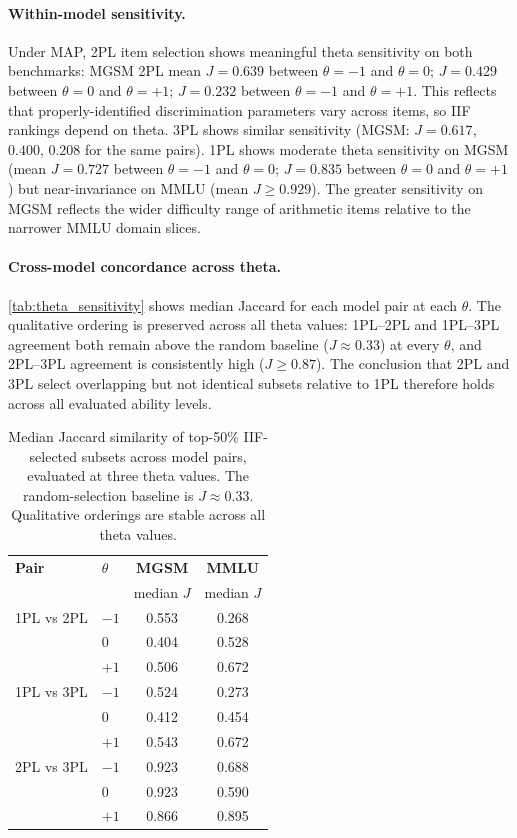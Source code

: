 \documentclass[11pt]{article}
\begin{document}
\paragraph{Within-model sensitivity.}
Under MAP, 2PL item selection shows meaningful theta sensitivity on both benchmarks:
MGSM 2PL mean $J = 0.639$ between $\theta=-1$ and $\theta=0$; $J = 0.429$ between
$\theta=0$ and $\theta=+1$; $J = 0.232$ between $\theta=-1$ and $\theta=+1$.
This reflects that properly-identified discrimination parameters vary across items,
so IIF rankings depend on theta. 3PL shows similar sensitivity (MGSM: $J = 0.617$,
$0.400$, $0.208$ for the same pairs).
1PL shows moderate theta sensitivity on MGSM (mean $J = 0.727$ between
$\theta=-1$ and $\theta=0$; $J = 0.835$ between $\theta=0$ and $\theta=+1$)
but near-invariance on MMLU (mean $J \geq 0.929$). The greater sensitivity on
MGSM reflects the wider difficulty range of arithmetic items relative to the
narrower MMLU domain slices.

\paragraph{Cross-model concordance across theta.}
\autoref{tab:theta_sensitivity} shows median Jaccard for each model pair at
each $\theta$. The qualitative ordering is preserved across all theta values:
1PL--2PL and 1PL--3PL agreement both remain above the random baseline ($J \approx 0.33$)
at every $\theta$, and 2PL--3PL agreement is consistently high ($J \geq 0.87$).
The conclusion that 2PL and 3PL select overlapping but not identical subsets
relative to 1PL therefore holds across all evaluated ability levels.

\begin{table}[h]
  \centering
  \small
  \begin{tabular}{llcc}
    \toprule
    \textbf{Pair} & $\theta$ & \textbf{MGSM} & \textbf{MMLU} \\
                  &          & median $J$    & median $J$ \\
    \midrule
    1PL vs 2PL & $-1$ & 0.553 & 0.268 \\
               &  $0$ & 0.404 & 0.528 \\
               & $+1$ & 0.506 & 0.672 \\
    \midrule
    1PL vs 3PL & $-1$ & 0.524 & 0.273 \\
               &  $0$ & 0.412 & 0.454 \\
               & $+1$ & 0.543 & 0.672 \\
    \midrule
    2PL vs 3PL & $-1$ & 0.923 & 0.688 \\
               &  $0$ & 0.923 & 0.590 \\
               & $+1$ & 0.866 & 0.895 \\
    \bottomrule
  \end{tabular}
  \caption{Median Jaccard similarity of top-50\% IIF-selected subsets across
    model pairs, evaluated at three theta values. The random-selection baseline
    is $J \approx 0.33$. Qualitative orderings are stable across all theta values.}
  \label{tab:theta_sensitivity}
\end{table}
\end{document}
